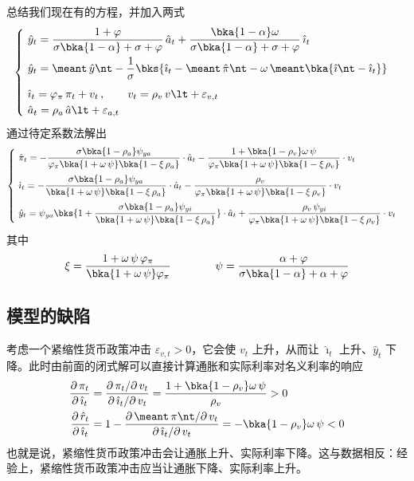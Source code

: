 总结我们现在有的方程，并加入两式
\begin{equation*}
    \begin{cases}
        \ \hat y_t=\dfrac{1+\varphi}{\sigma\bka{1-\alpha}+\sigma+\varphi}\,\hat a_t+\dfrac{\bka{1-\alpha}\omega}{\sigma\bka{1-\alpha}+\sigma+\varphi}\,\hat\imath_t\\[2ex]
        \ \hat y_t=\meant\,\hat y\nt-\dfrac{1}{\sigma}\bks{\hat\imath_t-\meant\,\hat\pi\nt-\omega\,\meant\bka{\hat\imath\nt-\hat\imath_t}}\\[2ex]
        \ \hat\imath_t=\varphi_\pi\,\pi_t+v_t\,,\qquad v_t=\rho_v\,v\lt+\varepsilon_{v,t}\\
        \ \hat a_t=\rho_a\,\hat a\lt+\varepsilon_{a,t}
    \end{cases}
\end{equation*}
通过待定系数法解出
\begin{equation*}
    \begin{cases}
        \ \hat \pi_t=-\dfrac{\sigma\bka{1-\rho_a}\psi_{ya}}{\varphi_\pi\bka{1+\omega\,\psi}\bka{1-\xi\,\rho_a}}\cdot\hat a_t-\dfrac{1+\bka{1-\rho_v}\omega\,\psi}{\varphi_\pi\bka{1+\omega\,\psi}\bka{1-\xi\,\rho_v}}\cdot v_t\\[2.5ex]
        \ \hat\imath_t=-\dfrac{\sigma\bka{1-\rho_a}\psi_{ya}}{\bka{1+\omega\,\psi}\bka{1-\xi\,\rho_a}}\cdot\hat a_t-\dfrac{\rho_v}{\varphi_\pi\bka{1+\omega\,\psi}\bka{1-\xi\,\rho_v}}\cdot v_t\\[2.5ex]
        \ \hat y_t=\psi_{ya}\bks{1+\dfrac{\sigma\bka{1-\rho_a}\psi_{yi}}{\bka{1+\omega\,\psi}\bka{1-\xi\,\rho_a}}}\cdot\hat a_t+\dfrac{\rho_v\,\psi_{yi}}{\varphi_\pi\bka{1+\omega\,\psi}\bka{1-\xi\,\rho_v}}\cdot v_t
    \end{cases}
\end{equation*}
其中
\begin{align*}
    \xi=\dfrac{1+\omega\,\psi\,\varphi_\pi}{\bka{1+\omega\,\psi}\varphi_\pi}\qquad\qquad \psi=\dfrac{\alpha+\varphi}{\sigma\bka{1-\alpha}+\alpha+\varphi}
\end{align*}

\subsection{模型的缺陷}

考虑一个紧缩性货币政策冲击 \(\varepsilon_{v,t}>0\)，它会使 \(v_t\) 上升，从而让 \(\hat\imath_t\) 上升、\(\hat y_t\) 下降。此时由前面的闭式解可以直接计算通胀和实际利率对名义利率的响应
\begin{align*}
    \dfrac{\partial\,\pi_t}{\partial\,\hat\imath_t}
    &=\dfrac{\partial\,\pi_t/\partial\, v_t}{\partial\,\hat\imath_t/\partial\, v_t}
    =\dfrac{1+\bka{1-\rho_v}\omega\,\psi}{\rho_v}>0\\
    \dfrac{\partial\,\hat r_t}{\partial\,\hat\imath_t}
    &=1-\dfrac{\partial\, \meant\,\pi\nt/\partial\, v_t}{\partial\,\hat\imath_t/\partial\, v_t}
    =-\bka{1-\rho_v}\omega\,\psi<0
\end{align*}
也就是说，紧缩性货币政策冲击会让通胀上升、实际利率下降。这与数据相反：经验上，紧缩性货币政策冲击应当让通胀下降、实际利率上升。

